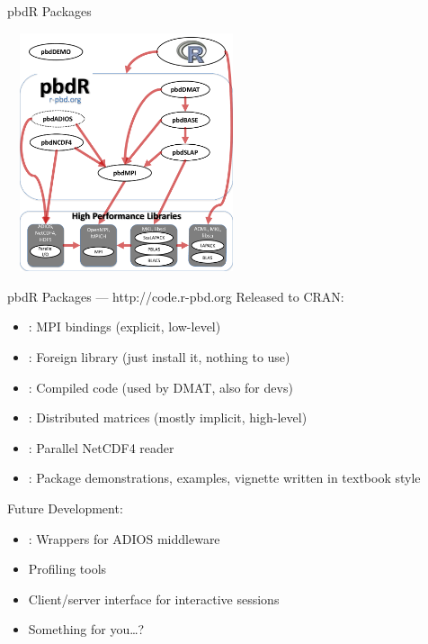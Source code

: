\begin{frame}[shrink]
  \begin{block}{pbdR Packages}
    \begin{center}
	\includegraphics[width=7cm, height=7cm]{pics/pbdpacks}
    \end{center}
  \end{block}
\end{frame}


\begin{frame}[shrink]
  \begin{block}{pbdR Packages --- http://code.r-pbd.org}\pause
  Released to CRAN:
  \begin{itemize}[<+-|alert@+>]
    \item {}: MPI bindings (explicit, low-level)
    \item {}: Foreign library (just install it, nothing to use)
    \item {}: Compiled code (used by DMAT, also for devs)
    \item {}: Distributed matrices (mostly implicit, high-level)
    \item {}: Parallel NetCDF4 reader
    \item {}: Package demonstrations, examples, vignette written in textbook style
  \end{itemize}
    Future Development:
  \begin{itemize}[<+-|alert@+>]
    \item {}: Wrappers for ADIOS middleware
    \item Profiling tools
    \item Client/server interface for interactive sessions
    \item Something for you\dots?
  \end{itemize}
  \end{block}
\end{frame}

